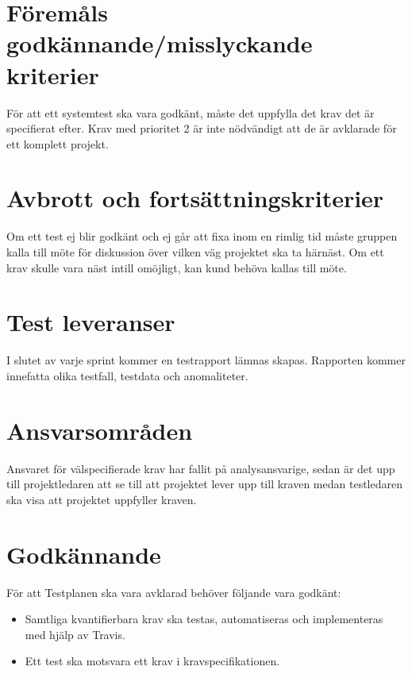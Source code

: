 	
	

\section{Föremåls godkännande/misslyckande kriterier}
	För att ett systemtest ska vara godkänt, måste det uppfylla det krav det är specifierat efter. Krav med prioritet 2 är inte nödvändigt att de är avklarade för ett komplett projekt.\\


\section{Avbrott och fortsättningskriterier}
	Om ett test ej blir godkänt och ej går att fixa inom en rimlig tid måste gruppen kalla till möte för diskussion över vilken väg projektet ska ta härnäst. Om ett krav skulle vara näst intill omöjligt, kan kund behöva kallas till möte.
	



\section{Test leveranser}
	I slutet av varje sprint kommer en testrapport lämnas skapas. Rapporten kommer innefatta olika testfall, testdata och anomaliteter.




\section{Ansvarsområden}
	Ansvaret för välspecifierade krav har fallit på analysansvarige, sedan är det upp till projektledaren att se till att projektet lever upp till kraven medan testledaren ska visa att projektet uppfyller kraven.

  

	
	
\section{Godkännande}
	För att Testplanen ska vara avklarad behöver följande vara godkänt:
	\begin{itemize}
	 \item Samtliga kvantifierbara krav ska testas, automatiseras och implementeras med hjälp av Travis.
	 \item Ett test ska motsvara ett krav i kravspecifikationen.
	\end{itemize}
	


